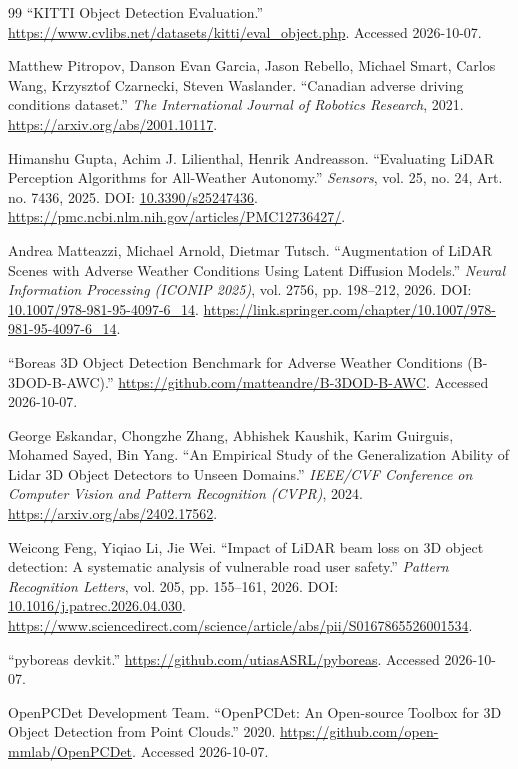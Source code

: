 \documentclass[10pt,twocolumn]{article}
\begin{document}
\begin{thebibliography}{99}
 ``KITTI Object Detection Evaluation.'' \url{https://www.cvlibs.net/datasets/kitti/eval_object.php}. Accessed 2026-10-07.

 Matthew Pitropov, Danson Evan Garcia, Jason Rebello, Michael Smart, Carlos Wang, Krzysztof Czarnecki, Steven Waslander. ``Canadian adverse driving conditions dataset.'' \textit{The International Journal of Robotics Research}, 2021. \url{https://arxiv.org/abs/2001.10117}.

 Himanshu Gupta, Achim J. Lilienthal, Henrik Andreasson. ``Evaluating LiDAR Perception Algorithms for All-Weather Autonomy.'' \textit{Sensors}, vol. 25, no. 24, Art. no. 7436, 2025. DOI: \href{https://doi.org/10.3390/s25247436}{10.3390/s25247436}. \url{https://pmc.ncbi.nlm.nih.gov/articles/PMC12736427/}.

 Andrea Matteazzi, Michael Arnold, Dietmar Tutsch. ``Augmentation of LiDAR Scenes with Adverse Weather Conditions Using Latent Diffusion Models.'' \textit{Neural Information Processing (ICONIP 2025)}, vol. 2756, pp. 198--212, 2026. DOI: \href{https://doi.org/10.1007/978-981-95-4097-6_14}{10.1007/978-981-95-4097-6\_14}. \url{https://link.springer.com/chapter/10.1007/978-981-95-4097-6_14}.

 ``Boreas 3D Object Detection Benchmark for Adverse Weather Conditions (B-3DOD-B-AWC).'' \url{https://github.com/matteandre/B-3DOD-B-AWC}. Accessed 2026-10-07.

 George Eskandar, Chongzhe Zhang, Abhishek Kaushik, Karim Guirguis, Mohamed Sayed, Bin Yang. ``An Empirical Study of the Generalization Ability of Lidar 3D Object Detectors to Unseen Domains.'' \textit{IEEE/CVF Conference on Computer Vision and Pattern Recognition (CVPR)}, 2024. \url{https://arxiv.org/abs/2402.17562}.

 Weicong Feng, Yiqiao Li, Jie Wei. ``Impact of LiDAR beam loss on 3D object detection: A systematic analysis of vulnerable road user safety.'' \textit{Pattern Recognition Letters}, vol. 205, pp. 155--161, 2026. DOI: \href{https://doi.org/10.1016/j.patrec.2026.04.030}{10.1016/j.patrec.2026.04.030}. \url{https://www.sciencedirect.com/science/article/abs/pii/S0167865526001534}.

 ``pyboreas devkit.'' \url{https://github.com/utiasASRL/pyboreas}. Accessed 2026-10-07.

 OpenPCDet Development Team. ``OpenPCDet: An Open-source Toolbox for 3D Object Detection from Point Clouds.'' 2020. \url{https://github.com/open-mmlab/OpenPCDet}. Accessed 2026-10-07.


\end{thebibliography}
\end{document}
